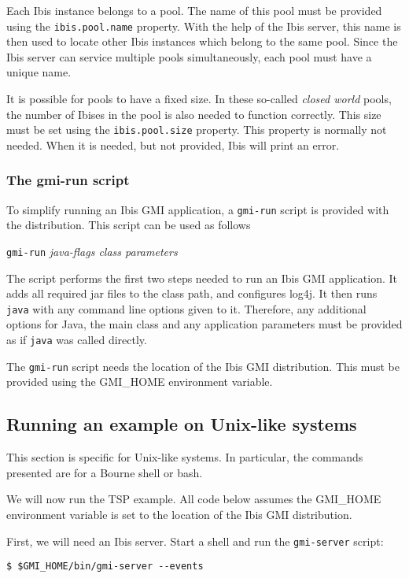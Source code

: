 \documentclass[a4paper,10pt]{article}
\begin{document}
Each Ibis instance belongs to a pool. The name of this pool must be provided
using the \texttt{ibis.pool.name} property. With the help of the Ibis server,
this name is then used to locate other Ibis instances which belong to the
same pool. Since the Ibis server can service multiple pools simultaneously,
each pool must have a unique name.

It is possible for pools to have a fixed size. In these so-called \emph{closed
world} pools, the number of Ibises in the pool is also needed to function
correctly. This size must be set using the \texttt{ibis.pool.size} property.
This property is normally not needed. When it is needed, but not provided, Ibis
will print an error. 

\subsubsection{The gmi-run script}

To simplify running an Ibis GMI application, a \texttt{gmi-run} script is
provided with the distribution. This script can be
used as follows

\begin{center}
\texttt{gmi-run} \emph{java-flags class parameters}
\end{center}

The script performs the first two steps needed to run an Ibis GMI application.
It adds all required jar files
to the class path, and configures log4j.
It then runs \texttt{java} with any
command line options given to it. Therefore, any additional options for
Java, the main class and any application parameters must be provided as
if \texttt{java} was called directly.

The \texttt{gmi-run} script needs the location of the Ibis GMI
distribution. This must be provided using the GMI\_HOME environment
variable.

\subsection{Running an example on Unix-like systems}

This section is specific for Unix-like systems. In particular, the
commands presented are for a Bourne shell or bash.

We will now run the TSP example. All code below assumes the GMI\_HOME
environment variable is set to the location of the Ibis GMI distribution.

First, we will need an Ibis server. Start a shell and
run the \texttt{gmi-server} script:
\noindent
{\small
\begin{verbatim}
$ $GMI_HOME/bin/gmi-server --events
\end{verbatim}
}
\noindent
\end{document}
